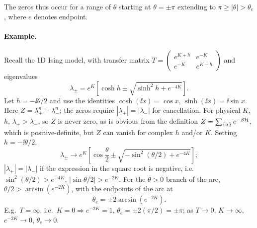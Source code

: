\begin{diagram}
\end{diagram}

The zeros thus occur for a range of $\theta$ starting at $\theta = \pm\pi$ extending to $\pi\ge|\theta|>\theta_e$,
where $e$ denotes endpoint.

\paragraph{Example.} Recall the 1D Ising model, with transfer matrix
$T = \left(\begin{smallmatrix}e^{K+h} & e^{-K}\\ e^{-K} & e^{K-h}\end{smallmatrix}\right)$ and eigenvalues
\begin{equation}
  \lambda_\pm = e^K\left[\cosh h\pm\sqrt{\sinh^2h+e^{-4K}}\right].
\end{equation}
Let $h = -\ii\theta/2$ and use the identities $\cosh(\ii x) = \cos x$, $\sinh(\ii x) = \ii\sin x$. Here
$Z = \lambda_+^n+\lambda_-^n$; the zeros require $|\lambda_+| = |\lambda_-|$ for cancellation. For physical $K$, $h$,
$\lambda_+>\lambda_-$, so $Z$ is never zero, as is obvious from the definition $Z = \sum_{\{\sigma\}}e^{-\beta\mathcal{H}}$,
which is positive-definite, but $Z$ can vanish for complex $h$ and/or $K$. Setting $h = -\ii\theta/2$,
\begin{equation}
  \lambda_\pm\to e^K\left[\cos\frac{\theta}{2}\pm\sqrt{-\sin^2(\theta/2)+e^{-4K}}\right];
\end{equation}
$|\lambda_+| = |\lambda_-|$ if the expression in the square root is negative, i.e.\
$\sin^2(\theta/2)>e^{-4K}$, $|\sin\theta/2|>e^{-2K}$. For the $\theta>0$ branch of the arc,
$\theta/2>\arcsin(e^{-2K})$, with the endpoints of the arc at
\begin{equation}
  \theta_e = \pm 2\arcsin(e^{-2K}).
\end{equation}
E.g.\ $T = \infty$, i.e.\ $K = 0\Rightarrow e^{-2K} = 1$, $\theta_e = \pm 2\left(\pi/2\right) = \pm\pi$; as $T\to 0$,
$K\to\infty$, $e^{-2K}\to 0$, $\theta_e\to 0$.

